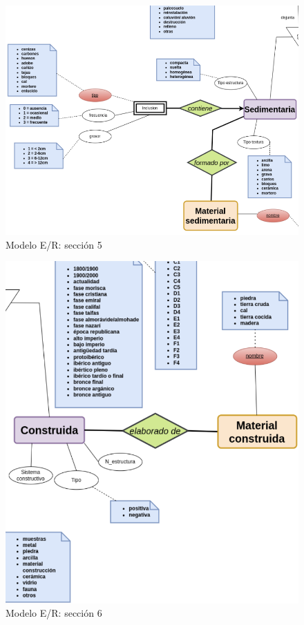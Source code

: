         \begin{figure}[H]
            \centering
            \includegraphics[scale=0.35]{imagenes/E-R5.png}
            \caption{Modelo E/R: sección 5}
            \label{fig:e-rmodel5}
        \end{figure}

        \begin{figure}[H]
            \centering
            \includegraphics[scale=0.35]{imagenes/E-R6.png}
            \caption{Modelo E/R: sección 6}
            \label{fig:e-rmodel6}
        \end{figure}


